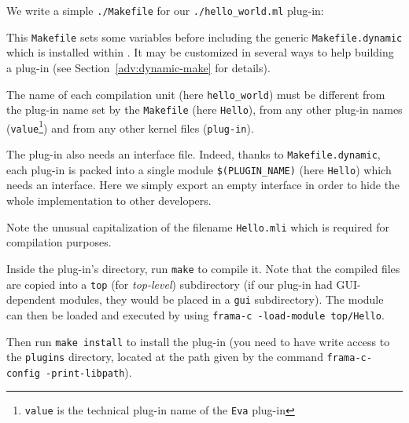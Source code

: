 
We write a simple \texttt{./Makefile} for our
\texttt{./hello\_world.ml} plug-in:


This \texttt{Makefile} sets some variables before including the generic
\texttt{Makefile.dynamic} which is installed within \framac. It may be
customized in several ways to help building a plug-in (see
Section~\ref{adv:dynamic-make} for details).

\begin{important}
  The name of each compilation unit (here \texttt{hello\_world}) must be
  different from the plug-in name set by the \texttt{Makefile} (here
  \texttt{Hello}), from any other plug-in names (\eg \texttt{value}\footnote{
    \texttt{value} is the technical plug-in name of the \texttt{Eva} plug-in})
    and from any other \framac kernel \caml files (\eg \texttt{plug-in}).
\end{important}

The plug-in also needs an interface file. Indeed, thanks to
\texttt{Makefile.dynamic}, each plug-in is packed into a single module
\texttt{\$(PLUGIN\_NAME)} (here \texttt{Hello}) which
needs an interface. Here we simply export an empty interface in order to hide
the whole implementation to other developers.

\begin{important}
  Note the unusual capitalization of the filename \texttt{Hello.mli} which is
  required for compilation purposes.
\end{important}

Inside the plug-in's directory, run \texttt{make} to compile it. Note that the
compiled files are copied into a \texttt{top} (for {\em top-level}) subdirectory
(if our plug-in had GUI-dependent modules, they would be placed in a
\texttt{gui} subdirectory).
The module can then be loaded and executed by using
\texttt{frama-c -load-module top/Hello}.

Then run \texttt{make install} to install the plug-in (you need to have write
access to the \texttt{plugins} directory, located at the path given by the
command \texttt{frama-c-config -print-libpath}).


